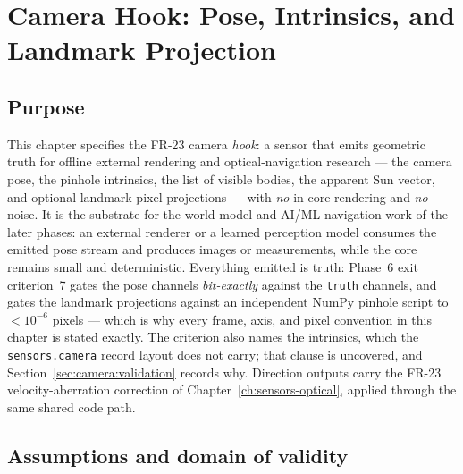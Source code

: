 \chapter{Camera Hook: Pose, Intrinsics, and Landmark Projection}
\label{ch:camera}

\section{Purpose}
\label{sec:camera:purpose}

This chapter specifies the FR-23 camera \emph{hook}: a sensor that emits
geometric truth for offline external rendering and optical-navigation
research --- the camera pose, the pinhole intrinsics, the list of
visible bodies, the apparent Sun vector, and optional landmark pixel
projections --- with \emph{no} in-core rendering and \emph{no} noise. It
is the substrate for the world-model and AI/ML navigation work of the
later phases: an external renderer or a learned perception model
consumes the emitted pose stream and produces images or measurements,
while the core remains small and deterministic. Everything emitted is
truth: Phase~6 exit criterion~7 gates the pose channels \emph{bit-exactly}
against the \texttt{truth} channels, and gates the landmark projections
against an independent NumPy pinhole script to $< 10^{-6}$ pixels ---
which is why every frame, axis, and pixel convention in this chapter is
stated exactly. The criterion also names the intrinsics, which the
\texttt{sensors.camera} record layout does not carry; that clause is
uncovered, and Section~\ref{sec:camera:validation} records why. Direction
outputs carry the FR-23 velocity-aberration correction of
Chapter~\ref{ch:sensors-optical}, applied through the same shared code
path.

\section{Assumptions and domain of validity}
\label{sec:camera:domain}

